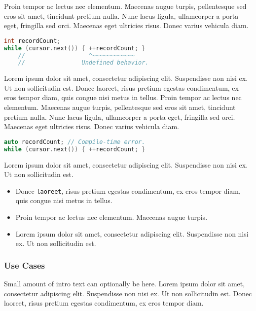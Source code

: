 \documentclass[twoside,10pt,letterpaper,usenames]{newstyle-PearsonGeneric-7-38}
\let\Begin\begin
\let\End\end
\begin{document}
\Begin{leftbar}

Proin tempor ac lectus nec elementum. Maecenas augue turpis,
pellentesque sed eros sit amet, tincidunt pretium nulla. Nunc lacus
ligula, ullamcorper a porta eget, fringilla sed orci. Maecenas eget
ultricies risus. Donec varius vehicula diam.

\begin{lstlisting}[language=C++]
int recordCount;
while (cursor.next()) { ++recordCount; }
    //                  ^~~~~~~~~~~~~
    //                Undefined behavior.
\end{lstlisting}
    

\End{leftbar}

Lorem ipsum dolor sit amet, consectetur adipiscing elit. Suspendisse non
nisi ex. Ut non sollicitudin est. Donec laoreet, risus pretium egestas
condimentum, ex eros tempor diam, quis congue nisi metus in tellus.
Proin tempor ac lectus nec elementum. Maecenas augue turpis,
pellentesque sed eros sit amet, tincidunt pretium nulla. Nunc lacus
ligula, ullamcorper a porta eget, fringilla sed orci. Maecenas eget
ultricies risus. Donec varius vehicula diam.

\begin{lstlisting}[language=C++]
auto recordCount; // Compile-time error.
while (cursor.next()) { ++recordCount; }
\end{lstlisting}
    

Lorem ipsum dolor sit amet, consectetur adipiscing elit. Suspendisse non
nisi ex. Ut non sollicitudin est.

\begin{itemize}
\item{Donec \texttt{laoreet}, risus pretium egestas condimentum, ex eros tempor diam, quis congue nisi metus in tellus.}
\item{Proin tempor ac lectus nec elementum. Maecenas augue turpis.}
\item{Lorem ipsum dolor sit amet, consectetur adipiscing elit. Suspendisse non nisi ex. Ut non sollicitudin est.}
\end{itemize}

\subsubsection[Use Cases]{Use Cases}\label{use-cases}

Small amount of intro text can optionally be here. Lorem ipsum dolor sit
amet, consectetur adipiscing elit. Suspendisse non nisi ex. Ut non
sollicitudin est. Donec laoreet, risus pretium egestas condimentum, ex
eros tempor diam.
\end{document}
